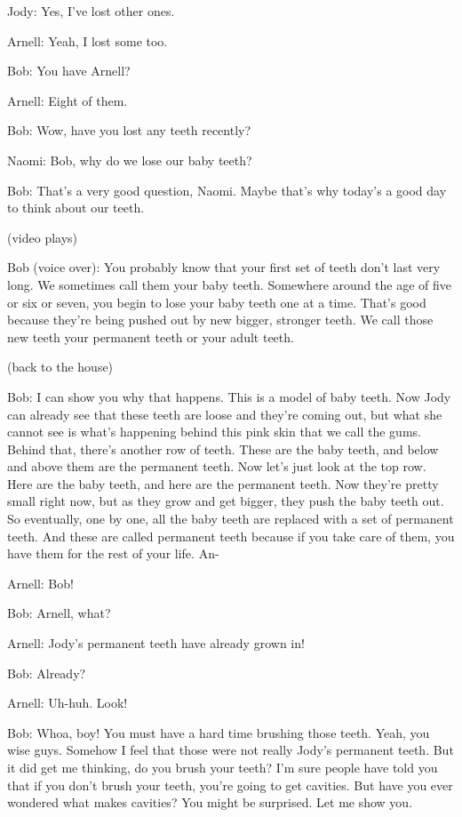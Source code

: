 Jody: Yes, I've lost other ones.

Arnell: Yeah, I lost some too.

Bob: You have Arnell?

Arnell: Eight of them.

Bob: Wow, have you lost any teeth recently?

Naomi: Bob, why do we lose our baby teeth?

Bob: That's a very good question, Naomi. Maybe that's why today's a good day to think about our teeth.

(video plays)

Bob (voice over): You probably know that your first set of teeth don't last very long. We sometimes call them your baby teeth. Somewhere around the age of five or six or seven, you begin to lose your baby teeth one at a time. That's good because they're being pushed out by new bigger, stronger teeth. We call those new teeth your permanent teeth or your adult teeth.

(back to the house)

Bob: I can show you why that happens. This is a model of baby teeth. Now Jody can already see that these teeth are loose and they're coming out, but what she cannot see is what's happening behind this pink skin that we call the gums. Behind that, there's another row of teeth. These are the baby teeth, and below and above them are the permanent teeth. Now let's just look at the top row. Here are the baby teeth, and here are the permanent teeth. Now they're pretty small right now, but as they grow and get bigger, they push the baby teeth out. So eventually, one by one, all the baby teeth are replaced with a set of permanent teeth. And these are called permanent teeth because if you take care of them, you have them for the rest of your life. An-

Arnell: Bob!

Bob: Arnell, what?

Arnell: Jody's permanent teeth have already grown in!

Bob: Already?

Arnell: Uh-huh. Look!

Bob: Whoa, boy! You must have a hard time brushing those teeth. Yeah, you wise guys. Somehow I feel that those were not really Jody's permanent teeth. But it did get me thinking, do you brush your teeth? I'm sure people have told you that if you don't brush your teeth, you're going to get cavities. But have you ever wondered what makes cavities? You might be surprised. Let me show you.

